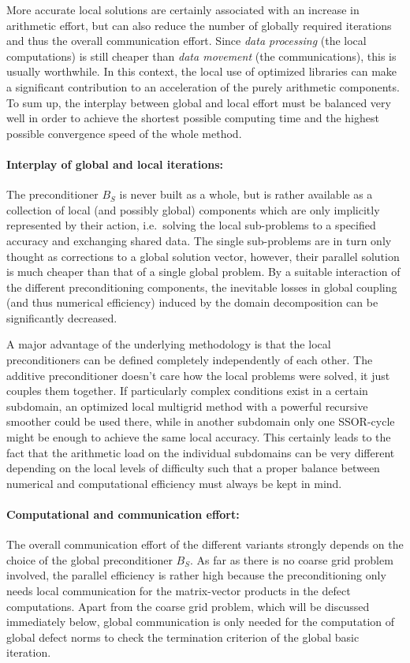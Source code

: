 More accurate local solutions are certainly associated with an increase in arithmetic effort, but can also reduce the number of globally required iterations and thus the overall communication effort. Since {\it data processing} (the local computations) is still cheaper than {\it data movement} (the communications), this is usually worthwhile.
In this context, the local use of optimized libraries can make a significant contribution to an acceleration of the purely arithmetic components.
To sum up, the interplay between global and local effort must be balanced very well in order to achieve the shortest possible computing time and the highest possible convergence speed of the whole method.

\paragraph{Interplay of global and local iterations:}
The preconditioner $B_S$ is never built as a whole, but is rather available as a collection of local (and possibly global) components which are only implicitly represented by their action, i.e.\ solving the local sub-problems to a specified accuracy and exchanging shared data.
The single sub-problems are in turn only thought as corrections to a global solution vector, however, their parallel solution is much cheaper than that of a single global problem. By a suitable interaction of the different preconditioning components, the inevitable losses in global coupling (and thus numerical efficiency) induced by the domain decomposition can be significantly decreased.

A major advantage of the underlying methodology is that the local preconditioners can be defined completely independently of each other. The additive \ols{} preconditioner doesn't care how the local problems were solved, it just couples them together.
If particularly complex conditions exist in a certain subdomain, an optimized local multigrid method with a powerful recursive smoother could be used there, while in another subdomain only one SSOR-cycle might be enough to achieve the same local accuracy. This certainly leads to the fact that the arithmetic load on the individual subdomains can be very different depending on the local levels of difficulty such that a proper balance between numerical and computational efficiency must always be kept in mind.

\paragraph{Computational and communication effort:}
The overall communication effort of the different variants strongly depends on the choice of the global preconditioner $B_S$. As far as there is no coarse grid problem involved, 
the parallel efficiency is rather high because the preconditioning only needs local communication for the matrix-vector products in the defect computations. Apart from the coarse grid problem, which will be discussed immediately below, global communication is only needed for the computation of global defect norms to check the termination criterion of the global basic iteration.


